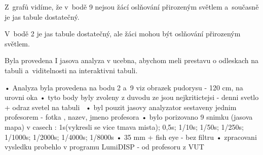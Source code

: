 Z~grafů vidíme, že v~bodě 9 nejsou žácí oslňování přirozeným světlem a~současně je jas tabule dostatečný.

V~bodě 2 je jas tabule dostatečný, ale žáci mohou být oslňování přirozeným světlem.

Byla provedena I jasova analyza v ucebna, abychom meli prestavu o odleskach na tabuli a~viditelnosti na interaktivni tabuli.

    • Analyza byla provedena na bodu 2 a~9 viz obrazek pudorysu - 120 cm, na urovni oka
    \medskip
    • tyto body byly zvoleny z duvodu ze jsou nejkritictejsi - denni svetlo + odraz svetel na tabuli\
    \medskip
    • byl pouzit jasovy analyzator sestaveny jednim profesorem - fotka , nazev, jmeno profesora
    \medskip
    • bylo porizovano 9 snimku (jasova mapa) v casech : 1s(vykresli se vice tmava mista); 0,5s; 1/10s; 1/50s; 1/250s; 1/1000s; 1/2000s; 1/4000s; 1/8000s
    \medskip
    • 35 mm + fish eye - bez filtru
    \medskip
    • zpracovani vysledku probehlo v programu LumiDISP - od profesoru z VUT




















